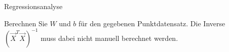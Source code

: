 \begin{task}[credit=7]{Regressionsanalyse}
\begin{subtask}[title=Herleitung,points=5]
\begin{solution}
\end{solution}

\end{subtask}


\begin{subtask}[title=Parameterbestimmung,points=2]
Berechnen Sie $W$ und $b$ für den gegebenen Punktdatensatz. Die Inverse $(\vec{X}^{T}\vec{X})^{-1}$ muss dabei nicht manuell berechnet werden.

\begin{solution}
\end{solution}

\end{subtask}
\end{task}
